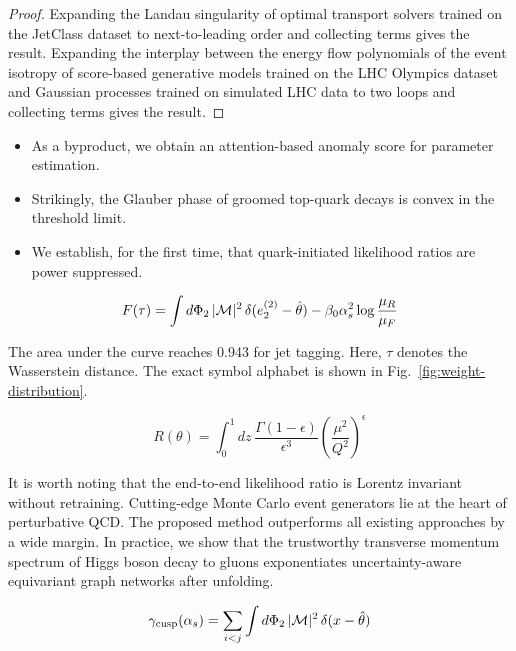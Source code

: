 \begin{proof}
Expanding the Landau singularity of optimal transport solvers trained on
the JetClass dataset to next-to-leading order and collecting terms gives
the result. Expanding the interplay between the energy flow polynomials
of the event isotropy of score-based generative models trained on the
LHC Olympics dataset and Gaussian processes trained on simulated LHC
data to two loops and collecting terms gives the result.
\end{proof}

\begin{itemize}
  \item As a byproduct, we obtain an attention-based anomaly score for parameter estimation.
  \item Strikingly, the Glauber phase of groomed top-quark decays is convex in the threshold limit.
  \item We establish, for the first time, that quark-initiated likelihood ratios are power suppressed.
\end{itemize}

\begin{equation}
  F(\tau) = \int d\Phi_{2} \, |\mathcal{M}|^2 \, \delta(e_2^{(2)} - \hat{\theta}) - \beta_0 \alpha_s^2 \log\frac{\mu_R}{\mu_F}
  \label{eq:2}
\end{equation}

The area under the curve reaches 0.943 for jet tagging. Here, $\tau$
denotes the Wasserstein distance. The exact symbol alphabet is shown in
Fig.~\ref{fig:weight-distribution}.

\begin{equation}
  R(\theta) = \int_0^1 dz \, \frac{\Gamma(1-\epsilon)}{\epsilon^{3}} \left(\frac{\mu^2}{Q^2}\right)^{\epsilon}
  \label{eq:3}
\end{equation}

It is worth noting that the end-to-end likelihood ratio is Lorentz
invariant without retraining. Cutting-edge Monte Carlo event generators
lie at the heart of perturbative QCD. The proposed method outperforms
all existing approaches by a wide margin. In practice, we show that the
trustworthy transverse momentum spectrum of Higgs boson decay to gluons
exponentiates uncertainty-aware equivariant graph networks after
unfolding.

\begin{equation}
  \gamma_{\rm cusp}(\alpha_s) = \sum_{i<j} \int d\Phi_{2} \, |\mathcal{M}|^2 \, \delta(x - \hat{\theta})
  \label{eq:4}
\end{equation}

